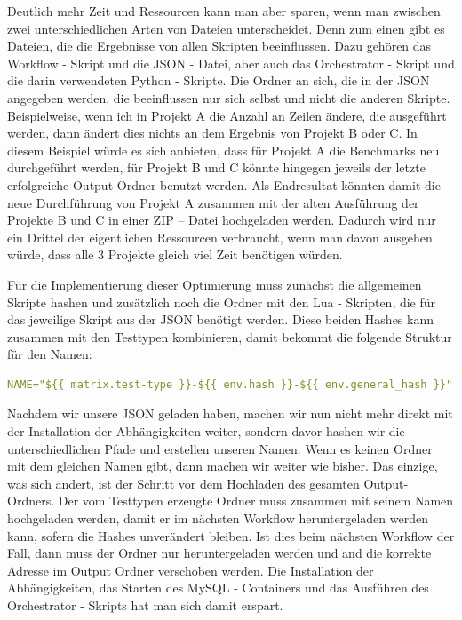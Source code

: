 Deutlich mehr Zeit und Ressourcen kann man aber sparen, wenn man zwischen zwei unterschiedlichen Arten von Dateien unterscheidet.
Denn zum einen gibt es Dateien, die die Ergebnisse von allen Skripten beeinflussen.
Dazu gehören das Workflow - Skript und die JSON - Datei, aber auch das Orchestrator - Skript und die darin verwendeten Python - Skripte.
Die Ordner an sich, die in der JSON angegeben werden, die beeinflussen nur sich selbst und nicht die anderen Skripte.
Beispielweise, wenn ich in Projekt A die Anzahl an Zeilen ändere, die ausgeführt werden, dann ändert dies nichts an dem Ergebnis von Projekt B oder C\@.
In diesem Beispiel würde es sich anbieten, dass für Projekt A die Benchmarks neu durchgeführt werden, für Projekt B und C könnte hingegen jeweils der letzte erfolgreiche Output Ordner benutzt werden.
Als Endresultat könnten damit die neue Durchführung von Projekt A zusammen mit der alten Ausführung der Projekte B und C in einer ZIP – Datei hochgeladen werden.
Dadurch wird nur ein Drittel der eigentlichen Ressourcen verbraucht, wenn man davon ausgehen würde, dass alle 3 Projekte gleich viel Zeit benötigen würden.

Für die Implementierung dieser Optimierung muss zunächst die allgemeinen Skripte hashen und zusätzlich noch die Ordner mit den Lua - Skripten, die für das jeweilige Skript aus der JSON benötigt werden.
Diese beiden Hashes kann zusammen mit den Testtypen kombinieren, damit bekommt die folgende Struktur für den Namen:

\begin{lstlisting}[language=yaml,label={lst:hash_name},style=custom_daniel]
NAME="${{ matrix.test-type }}-${{ env.hash }}-${{ env.general_hash }}"
\end{lstlisting}

Nachdem wir unsere JSON geladen haben, machen wir nun nicht mehr direkt mit der Installation der Abhängigkeiten weiter, sondern davor hashen wir die unterschiedlichen Pfade und erstellen unseren Namen.
Wenn es keinen Ordner mit dem gleichen Namen gibt, dann machen wir weiter wie bisher.
Das einzige, was sich ändert, ist der Schritt vor dem Hochladen des gesamten Output-Ordners.
Der vom Testtypen erzeugte Ordner muss zusammen mit seinem Namen hochgeladen werden, damit er im nächsten Workflow heruntergeladen werden kann, sofern die Hashes unverändert bleiben.
Ist dies beim nächsten Workflow der Fall, dann muss der Ordner nur heruntergeladen werden und and die korrekte Adresse im Output Ordner verschoben werden.
Die Installation der Abhängigkeiten, das Starten des MySQL - Containers und das Ausführen des Orchestrator - Skripts hat man sich damit erspart.

